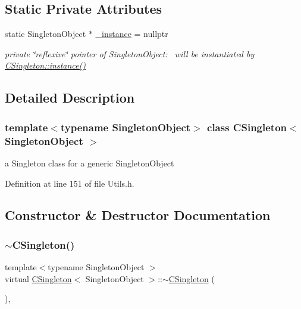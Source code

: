 \subsection*{Static Private Attributes}
\begin{DoxyCompactItemize}
\item 
static Singleton\+Object $\ast$ \hyperlink{classCSingleton_a690e0816be5d469e60d074cf8c5d139c}{\+\_\+instance} = nullptr
\begin{DoxyCompactList}\small\item\em private \char`\"{}reflexive\char`\"{} pointer of Singleton\+Object\+:~\newline
 will be instantiated by \hyperlink{classCSingleton_a58f5ac3aaaea8079a373350594726bdf}{C\+Singleton\+::instance()} \end{DoxyCompactList}\end{DoxyCompactItemize}


\subsection{Detailed Description}
\subsubsection*{template$<$typename Singleton\+Object$>$\newline
class C\+Singleton$<$ Singleton\+Object $>$}

a Singleton class for a generic Singleton\+Object 

Definition at line 151 of file Utils.\+h.



\subsection{Constructor \& Destructor Documentation}
\mbox{\label{classCSingleton_ad790e6c170b3e2da7fbb10873eeb882e}} 
\subsubsection{\texorpdfstring{$\sim$\+C\+Singleton()}{~CSingleton()}}
{\footnotesize\ttfamily template$<$typename Singleton\+Object $>$ \\
virtual \hyperlink{classCSingleton}{C\+Singleton}$<$ Singleton\+Object $>$\+::$\sim$\hyperlink{classCSingleton}{C\+Singleton} (\begin{DoxyParamCaption}{ }\end{DoxyParamCaption})\hspace{0.3cm}{\ttfamily [inline]}, {\ttfamily [virtual]}}



